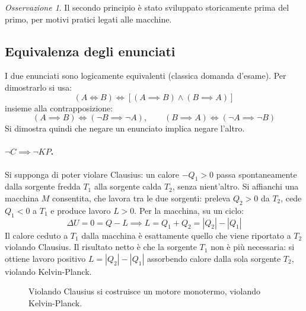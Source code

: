 \documentclass[11pt, a4paper, openright]{book}
\theoremstyle{plain}
\theoremstyle{definition}
\theoremstyle{remark}
\newtheorem{osservazione}[teorema]{Osservazione}
\begin{document}
\begin{osservazione}
    Il secondo principio è stato sviluppato storicamente prima del primo, per motivi pratici legati alle macchine.
\end{osservazione}

\subsection{Equivalenza degli enunciati}
I due enunciati sono logicamente equivalenti (classica domanda d'esame). Per dimostrarlo si usa:
\begin{equation}
    (A \iff B) \iff \left[(A \implies B) \wedge (B \implies A)\right]
\end{equation}
insieme alla contrapposizione:
\begin{equation}
    (A \implies B) \iff (\neg B \implies \neg A), \qquad (B \implies A) \iff (\neg A \implies \neg B)
\end{equation}
Si dimostra quindi che negare un enunciato implica negare l'altro.

\paragraph{$\neg C \implies \neg KP$.} Si supponga di poter violare Clausius: un calore $-Q_1 > 0$ passa spontaneamente dalla sorgente fredda $T_1$ alla sorgente calda $T_2$, senza nient'altro. Si affianchi una macchina $M$ consentita, che lavora tra le due sorgenti: preleva $Q_2 > 0$ da $T_2$, cede $Q_1 < 0$ a $T_1$ e produce lavoro $L > 0$. Per la macchina, su un ciclo:
\begin{equation}
    \Delta U = 0 = Q - L \implies L = Q_1 + Q_2 = |Q_2| - |Q_1|
\end{equation}
Il calore ceduto a $T_1$ dalla macchina è esattamente quello che viene riportato a $T_2$ violando Clausius. Il risultato netto è che la sorgente $T_1$ non è più necessaria: si ottiene lavoro positivo $L = |Q_2| - |Q_1|$ assorbendo calore dalla sola sorgente $T_2$, violando Kelvin-Planck.

\begin{figure}[H]
    \centering
    \caption{Violando Clausius si costruisce un motore monotermo, violando Kelvin-Planck.}
\end{figure}
\end{document}
